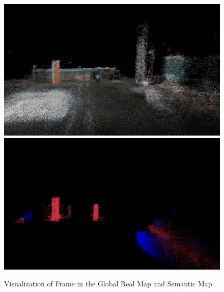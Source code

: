 \begin{figure}[H]
    \centering
    \includegraphics[width=.5\linewidth]
    {Pictures/mapping/vis_map1.png}\hfill
    \includegraphics[width=.5\linewidth]{Pictures/mapping/vis_map2.png}
    \caption{Visualization of Frame in the Global Real Map and Semantic Map}
    \label{fig:map1}
\end{figure}

